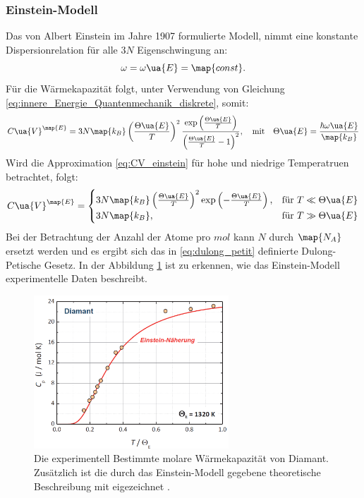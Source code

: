 \subsubsection{Einstein-Modell}
Das von Albert Einstein im Jahre 1907 formulierte Modell, nimmt eine konstante
Dispersionrelation für alle $3N$ Eigenschwingung an:
\begin{equation}
  \label{eq:dispersion_einstein}
  \omega=\omega\ua{E}=\map{const}.
\end{equation}
Für die Wärmekapazität folgt, unter Verwendung von Gleichung \eqref{eq:innere_Energie_Quantenmechanik_diskrete}, somit:
\begin{equation}
  \label{eq:CV_einstein}
  C\ua{V}^{\map{E}}= 3N\map{k_B}\left(\frac{\Theta\ua{E}}{T}\right)^2\frac{\exp\left(\frac{\Theta\ua{E}}{T}\right)}{\left(\frac{\Theta\ua{E}}{T}-1\right)^2}, \quad \text{mit} \quad \Theta\ua{E} = \frac{\hbar\omega\ua{E}}{\map{k_B}}
\end{equation}
Wird die Approximation \eqref{eq:CV_einstein} für hohe und niedrige Temperatruen
betrachtet, folgt:
\begin{equation}
  C\ua{V}^{\map{E}}=
  \begin{cases}
     3N\map{k_B}\left(\frac{\Theta\ua{E}}{T}\right)^2 \exp\left(-\frac{\Theta\ua{E}}{T}\right), &\text{für } T\ll\Theta\ua{E}  \\
     3N\map{k_B}, & \text{für } T \gg \Theta\ua{E}
  \end{cases}
\end{equation}
Bei der Betrachtung der Anzahl der Atome pro $\si{mol}$ kann $N$ durch $\map{N_A}$
ersetzt werden und es ergibt sich das in \eqref{eq:dulong_petit} definierte
Dulong-Petische Gesetz. In der Abbildung \ref{fig: einstein_modell_plot} ist zu erkennen, wie das Einstein-Modell
experimentelle Daten beschreibt.
\begin{figure}
  \centering
  \includegraphics[width = 0.65\textwidth]{./content/images/einstein.PNG}
  \caption{Die experimentell Bestimmte molare Wärmekapazität von Diamant. Zusätzlich ist die durch das Einstein-Modell
  gegebene theoretische Beschreibung mit eigezeichnet \cite[S. 225]{marx}.}
  \label{fig: einstein_modell_plot}
\end{figure}
